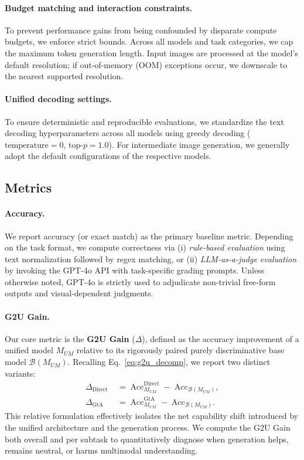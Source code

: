 \documentclass{article}
\theoremstyle{plain}
\theoremstyle{definition}
\theoremstyle{remark}
\begin{document}
\paragraph{Budget matching and interaction constraints.}
To prevent performance gains from being confounded by disparate compute budgets, we enforce strict bounds. Across all models and task categories, we cap the maximum token generation length. Input images are processed at the model's default resolution; if out-of-memory (OOM) exceptions occur, we downscale to the nearest supported resolution.

\paragraph{Unified decoding settings.}
To ensure deterministic and reproducible evaluations, we standardize the text decoding hyperparameters across all models using greedy decoding ($\text{temperature} = 0$, $\text{top-}p = 1.0$). For intermediate image generation, we generally adopt the default configurations of the respective models.

\subsection{Metrics}
\label{sec:metrics}

\paragraph{Accuracy.}
We report accuracy (or exact match) as the primary baseline metric. Depending on the task format, we compute correctness via (i) \emph{rule-based evaluation} using text normalization followed by regex matching, or (ii) \emph{LLM-as-a-judge evaluation} by invoking the GPT-4o API with task-specific grading prompts. Unless otherwise noted, GPT-4o is strictly used to adjudicate non-trivial free-form outputs and visual-dependent judgments.

\paragraph{G2U Gain.}
Our core metric is the \textbf{G2U Gain} ($\Delta$), defined as the accuracy improvement of a unified model $M_{UM}$ relative to its rigorously paired purely discriminative base model $\mathcal{B}(M_{UM})$. Recalling Eq.~\ref{eq:g2u_decomp}, we report two distinct variants:
\begin{align}
\Delta_{\mathrm{Direct}} \;&=\; \mathrm{Acc}^{\text{Direct}}_{M_{UM}} \; -\; \mathrm{Acc}_{\mathcal{B}(M_{UM})}, \label{eq:direct_g2u_gain}\\
\Delta_{\mathrm{GtA}} \;&=\; \mathrm{Acc}^{\text{GtA}}_{M_{UM}} \; -\; \mathrm{Acc}_{\mathcal{B}(M_{UM})}. \label{eq:gta_g2u_gain}
\end{align}
This relative formulation effectively isolates the net capability shift introduced by the unified architecture and the generation process. We compute the G2U Gain both overall and per subtask to quantitatively diagnose when generation helps, remains neutral, or harms multimodal understanding.
\end{document}

